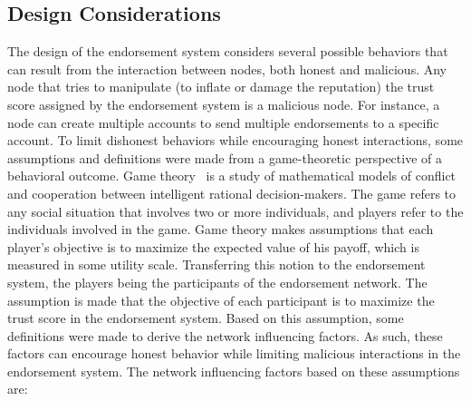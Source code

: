 \subsection{Design Considerations}
The design of the endorsement system considers several possible behaviors that
can result from the interaction between nodes, both honest and malicious. Any
node that tries to manipulate (to inflate or damage the reputation) the trust
score assigned by the endorsement system is a malicious node. For instance, a
node can create multiple accounts to send multiple endorsements to a specific
account. To limit dishonest behaviors while encouraging honest interactions,
some assumptions and definitions were made from a game-theoretic perspective of
a behavioral outcome. Game theory~\cite{myerson2013game} is a study of
mathematical models of conflict and cooperation between intelligent rational
decision-makers. The game refers to any social situation that involves two or
more individuals, and players refer to the individuals involved in the game.
Game theory makes assumptions that each player's objective is to maximize the
expected value of his payoff, which is measured in some utility scale.
Transferring this notion to the endorsement system, the players being the
participants of the endorsement network. The assumption is made that the
objective of each participant is to maximize the trust score in the endorsement
system. Based on this assumption, some definitions were made to derive the
network influencing factors. As such, these factors can encourage honest
behavior while limiting malicious interactions in the endorsement system. 
The network influencing factors based on these assumptions are:
